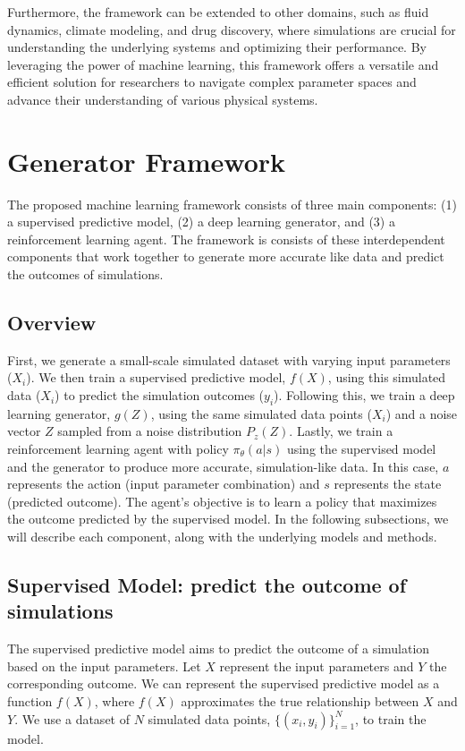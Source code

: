 \documentclass{article}
\begin{document}
Furthermore, the framework can be extended to other domains, such as fluid dynamics, climate modeling, and drug discovery, where simulations are crucial for understanding the underlying systems and optimizing their performance. By leveraging the power of machine learning, this framework offers a versatile and efficient solution for researchers to navigate complex parameter spaces and advance their understanding of various physical systems.

\section{Generator Framework}

The proposed machine learning framework consists of three main components: (1) a supervised predictive model, (2) a deep learning generator, and  (3) a reinforcement learning agent. The framework is consists of these interdependent components that work together to generate more accurate  like data and predict the outcomes of simulations.

\subsection{Overview}
First, we generate a small-scale simulated dataset with varying input parameters ($X_i$). We then train a supervised predictive model, $f(X)$, using this simulated data ($X_i$) to predict the simulation outcomes ($y_i$). Following this, we train a deep learning generator, $g(Z)$, using the same simulated data points ($X_i$) and a noise vector $Z$ sampled from a noise distribution $P_z(Z)$. Lastly, we train a reinforcement learning agent with policy $\pi_{\theta}(a|s)$ using the supervised model and the generator to produce more accurate, simulation-like data. In this case, $a$ represents the action (input parameter combination) and $s$ represents the state (predicted outcome). The agent's objective is to learn a policy that maximizes the outcome predicted by the supervised model. In the following subsections, we will describe each component, along with the underlying models and methods.

\subsection{Supervised Model: predict the outcome of simulations}

The supervised predictive model aims to predict the outcome of a simulation based on the input parameters. Let $X$ represent the input parameters and $Y$ the corresponding outcome. We can represent the supervised predictive model as a function $f(X)$, where $f(X)$ approximates the true relationship between $X$ and $Y$. We use a dataset of $N$ simulated data points, $\{(x_i, y_i)\}_{i=1}^{N}$, to train the model.
\end{document}
